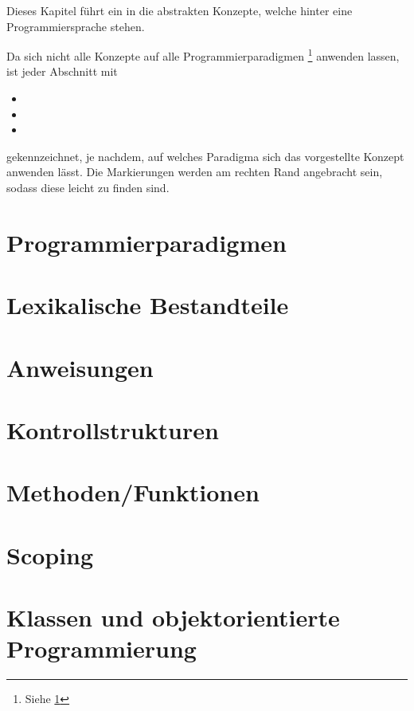 Dieses Kapitel führt ein in die abstrakten Konzepte, welche hinter eine Programmiersprache stehen.

Da sich nicht alle Konzepte auf alle Programmierparadigmen \footnote{Siehe \ref{sec:paradigmen}} anwenden lassen, ist jeder Abschnitt mit
\begin{itemize}
	\item[] \functional
	\item[] \imperative
	\item[] \oop
\end{itemize}
gekennzeichnet, je nachdem, auf welches Paradigma sich das vorgestellte Konzept anwenden lässt. Die Markierungen werden am rechten Rand angebracht sein, sodass diese leicht zu finden sind.

\section{Programmierparadigmen}
	\label{sec:paradigmen}
	
	

\section{Lexikalische Bestandteile}
	

\section{Anweisungen}
	

\section{Kontrollstrukturen}
	

\section{Methoden/Funktionen}
	

\section{Scoping}
	

\section{Klassen und objektorientierte Programmierung}
	

